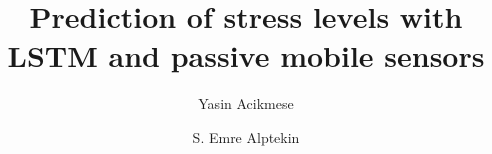 \documentclass[3p,times,procedia]{elsarticle}
\begin{document}
\begin{frontmatter}



%

\title{Prediction of stress levels with LSTM and passive mobile sensors}




\author[a]{Yasin Acikmese} 
\author[b]{S. Emre Alptekin}

\address[a, b]{Galatasaray University, Ciragan Cad. No.36, 34357 Istanbul, Turkey}



\end{frontmatter}
\end{document}
